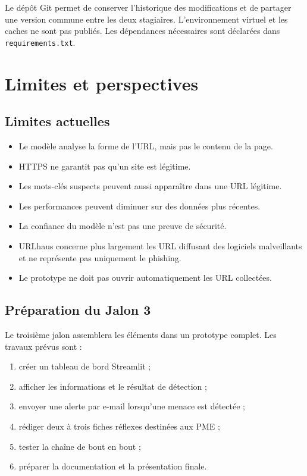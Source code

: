 \documentclass[11pt,a4paper]{report}
\begin{document}
Le dépôt Git permet de conserver l'historique des modifications et de
partager une version commune entre les deux stagiaires. L'environnement
virtuel et les caches ne sont pas publiés. Les dépendances nécessaires sont
déclarées dans \texttt{requirements.txt}.

\chapter{Limites et perspectives}

\section{Limites actuelles}

\begin{itemize}
  \item Le modèle analyse la forme de l'URL, mais pas le contenu de la page.
  \item HTTPS ne garantit pas qu'un site est légitime.
  \item Les mots-clés suspects peuvent aussi apparaître dans une URL légitime.
  \item Les performances peuvent diminuer sur des données plus récentes.
  \item La confiance du modèle n'est pas une preuve de sécurité.
  \item URLhaus concerne plus largement les URL diffusant des logiciels
        malveillants et ne représente pas uniquement le phishing.
  \item Le prototype ne doit pas ouvrir automatiquement les URL collectées.
\end{itemize}

\section{Préparation du Jalon 3}

Le troisième jalon assemblera les éléments dans un prototype complet. Les
travaux prévus sont :

\begin{enumerate}
  \item créer un tableau de bord Streamlit ;
  \item afficher les informations et le résultat de détection ;
  \item envoyer une alerte par e-mail lorsqu'une menace est détectée ;
  \item rédiger deux à trois fiches réflexes destinées aux PME ;
  \item tester la chaîne de bout en bout ;
  \item préparer la documentation et la présentation finale.
\end{enumerate}
\end{document}
